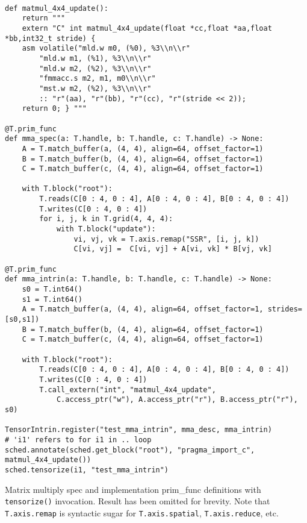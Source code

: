 \documentclass[acmsmall, nonacm=true]{acmart}
\begin{document}
\begin{listing}
    \centering
    \begin{verbatim}

def matmul_4x4_update():
    return """
    extern "C" int matmul_4x4_update(float *cc,float *aa,float *bb,int32_t stride) {
    asm volatile("mld.w m0, (%0), %3\\n\\r"  
        "mld.w m1, (%1), %3\\n\\r"
        "mld.w m2, (%2), %3\\n\\r"
        "fmmacc.s m2, m1, m0\\n\\r"
        "mst.w m2, (%2), %3\\n\\r" 
        :: "r"(aa), "r"(bb), "r"(cc), "r"(stride << 2));
    return 0; } """

@T.prim_func
def mma_spec(a: T.handle, b: T.handle, c: T.handle) -> None:
    A = T.match_buffer(a, (4, 4), align=64, offset_factor=1)
    B = T.match_buffer(b, (4, 4), align=64, offset_factor=1)
    C = T.match_buffer(c, (4, 4), align=64, offset_factor=1)

    with T.block("root"):
        T.reads(C[0 : 4, 0 : 4], A[0 : 4, 0 : 4], B[0 : 4, 0 : 4])
        T.writes(C[0 : 4, 0 : 4])
        for i, j, k in T.grid(4, 4, 4):
            with T.block("update"):
                vi, vj, vk = T.axis.remap("SSR", [i, j, k])
                C[vi, vj] =  C[vi, vj] + A[vi, vk] * B[vj, vk]         

@T.prim_func
def mma_intrin(a: T.handle, b: T.handle, c: T.handle) -> None:
    s0 = T.int64()
    s1 = T.int64()
    A = T.match_buffer(a, (4, 4), align=64, offset_factor=1, strides=[s0,s1])
    B = T.match_buffer(b, (4, 4), align=64, offset_factor=1)
    C = T.match_buffer(c, (4, 4), align=64, offset_factor=1)

    with T.block("root"):
        T.reads(C[0 : 4, 0 : 4], A[0 : 4, 0 : 4], B[0 : 4, 0 : 4])
        T.writes(C[0 : 4, 0 : 4])
        T.call_extern("int", "matmul_4x4_update", 
            C.access_ptr("w"), A.access_ptr("r"), B.access_ptr("r"), s0)

TensorIntrin.register("test_mma_intrin", mma_desc, mma_intrin)
# 'i1' refers to for i1 in .. loop
sched.annotate(sched.get_block("root"), "pragma_import_c", matmul_4x4_update())
sched.tensorize(i1, "test_mma_intrin")

    \end{verbatim}
\caption{Matrix multiply spec and implementation prim\_func definitions with \texttt{tensorize()} invocation. Result has been omitted for brevity. Note that \texttt{T.axis.remap} is syntactic sugar for \texttt{T.axis.spatial}, \texttt{T.axis.reduce}, etc.}
\label{lst:tvm_matmul_tensorize}
\end{listing}
\end{document}
